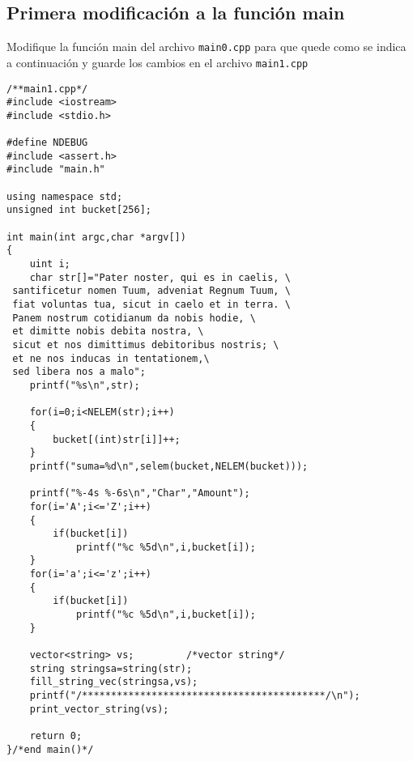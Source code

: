 \documentclass[12pt]{article}
\begin{document}
\subsection*{Primera modif\/icaci\'{o}n a la funci\'{o}n main}
Modif\/ique la funci\'{o}n main del archivo {\tt main0.cpp} para que quede como se indica a 
continuaci\'{o}n y guarde los cambios en el archivo {\tt main1.cpp}
\begin{verbatim}
/**main1.cpp*/
#include <iostream>
#include <stdio.h>

#define NDEBUG
#include <assert.h>
#include "main.h"

using namespace std;
unsigned int bucket[256];

int main(int argc,char *argv[])
{
    uint i;
    char str[]="Pater noster, qui es in caelis, \
 santificetur nomen Tuum, adveniat Regnum Tuum, \
 fiat voluntas tua, sicut in caelo et in terra. \
 Panem nostrum cotidianum da nobis hodie, \
 et dimitte nobis debita nostra, \
 sicut et nos dimittimus debitoribus nostris; \
 et ne nos inducas in tentationem,\
 sed libera nos a malo";
    printf("%s\n",str);

    for(i=0;i<NELEM(str);i++)
    {
        bucket[(int)str[i]]++;
    }
    printf("suma=%d\n",selem(bucket,NELEM(bucket)));

    printf("%-4s %-6s\n","Char","Amount");
    for(i='A';i<='Z';i++)
    {
        if(bucket[i])
            printf("%c %5d\n",i,bucket[i]);
    }
    for(i='a';i<='z';i++)
    {
        if(bucket[i])
            printf("%c %5d\n",i,bucket[i]);
    }
    
    vector<string> vs;         /*vector string*/
    string stringsa=string(str);
    fill_string_vec(stringsa,vs);
    printf("/******************************************/\n");
    print_vector_string(vs);

    return 0;
}/*end main()*/

\end{verbatim}
\end{document}
